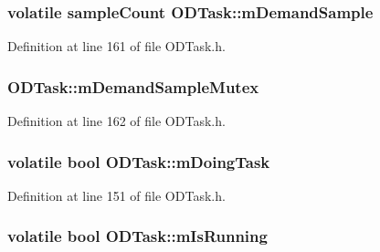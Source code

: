 \subsubsection[{\texorpdfstring{m\+Demand\+Sample}{mDemandSample}}]{\setlength{\rightskip}{0pt plus 5cm}volatile {\bf sample\+Count} O\+D\+Task\+::m\+Demand\+Sample\hspace{0.3cm}{\ttfamily [protected]}}\hypertarget{class_o_d_task_a2805d376b4e66174128836a31ce4b4ce}{}\label{class_o_d_task_a2805d376b4e66174128836a31ce4b4ce}


Definition at line 161 of file O\+D\+Task.\+h.

\subsubsection[{\texorpdfstring{m\+Demand\+Sample\+Mutex}{mDemandSampleMutex}}]{ O\+D\+Task\+::m\+Demand\+Sample\+Mutex\hspace{0.3cm}{\ttfamily [protected]}}\hypertarget{class_o_d_task_a24ad4b2b8c1b2d647200b86bc9aabf50}{}\label{class_o_d_task_a24ad4b2b8c1b2d647200b86bc9aabf50}


Definition at line 162 of file O\+D\+Task.\+h.

\subsubsection[{\texorpdfstring{m\+Doing\+Task}{mDoingTask}}]{\setlength{\rightskip}{0pt plus 5cm}volatile {\bf bool} O\+D\+Task\+::m\+Doing\+Task\hspace{0.3cm}{\ttfamily [protected]}}\hypertarget{class_o_d_task_ad90a5f35f8ec6c50357c9328781ee542}{}\label{class_o_d_task_ad90a5f35f8ec6c50357c9328781ee542}


Definition at line 151 of file O\+D\+Task.\+h.

\subsubsection[{\texorpdfstring{m\+Is\+Running}{mIsRunning}}]{\setlength{\rightskip}{0pt plus 5cm}volatile {\bf bool} O\+D\+Task\+::m\+Is\+Running\hspace{0.3cm}{\ttfamily [protected]}}\hypertarget{class_o_d_task_a01b2cdf425a94cc4c1cb450a40e19f34}{}\label{class_o_d_task_a01b2cdf425a94cc4c1cb450a40e19f34}


